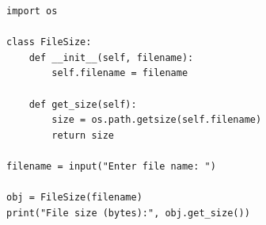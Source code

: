 \begin{verbatim}
import os

class FileSize:
    def __init__(self, filename):
        self.filename = filename

    def get_size(self):
        size = os.path.getsize(self.filename)
        return size

filename = input("Enter file name: ")

obj = FileSize(filename)
print("File size (bytes):", obj.get_size())
\end{verbatim}